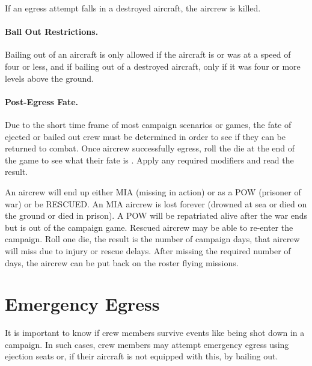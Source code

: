 \begin{advancedrules}
{If an egress attempt falls in a destroyed aircraft, the aircrew is killed.

\paragraph{Ball Out Restrictions.} Bailing out of an aircraft is only allowed if the aircraft is or was at a speed of four or less, and if bailing out of a destroyed aircraft, only if it was four or more levels above the ground. 


\paragraph{Post-Egress Fate.\label{rule:post-egress-fate}} Due to the short time frame of most campaign scenarios or games, the fate of ejected or bailed out crew must be determined in order to see if they can be returned to combat. Once aircrew successfully egress, roll the die at the end of the game to see what their fate is . Apply any required modifiers and read the result.

An aircrew will end up either MIA (missing in action) or as a POW (prisoner of war) or be RESCUED. An MIA aircrew is lost forever (drowned at sea or died on the ground or died in prison). A POW will be repatriated alive after the war ends but is out of the campaign game. Rescued aircrew may be able to re-enter the campaign. Roll one die, the result is the number of campaign days, that aircrew will miss due to injury or rescue delays. After missing the required number of days, the aircrew can be put back on the roster flying missions.

}{

\section{Emergency Egress}
\label{rule:ejections-and-bail-outs}
\label{rule:emergency-egress}


It is important to know if crew members survive events like being shot down in a campaign. In such cases, crew members may attempt emergency egress using ejection seats or, if their aircraft is not equipped with this, by bailing out.

}
\end{advancedrules}

